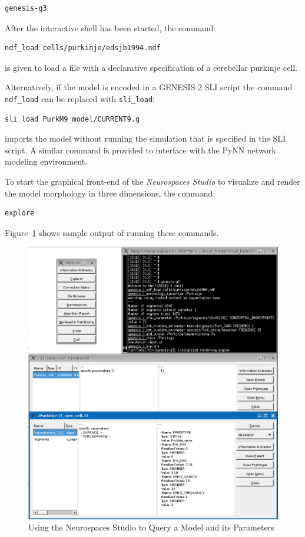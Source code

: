 \documentclass[12pt]{article}
\begin{document}
{\footnotesize
\begin{verbatim}
genesis-g3
\end{verbatim}
}

After the interactive shell has been started, the command:

{\footnotesize
\begin{verbatim}
ndf_load cells/purkinje/edsjb1994.ndf
\end{verbatim}
}

is given to load a file with a declarative specification of a
cerebellar purkinje cell.

Alternatively, if the model is encoded in a GENESIS 2 SLI script the
command {\tt ndf\_load} can be replaced with {\tt sli\_load}:

{\footnotesize
\begin{verbatim}
sli_load PurkM9_model/CURRENT9.g
\end{verbatim}
}

imports the model without running the simulation that is specified in
the SLI script.  A similar command is provided to interface with the
PyNN network modeling environment\cite{andrew08:_pynn}.

To start the graphical front-end of the {\it Neurospaces Studio} to
visualize and render the model morphology in three dimensions, the
command:

{\footnotesize
\begin{verbatim}
explore
\end{verbatim}
}

Figure~\ref{fig:cbi-studio} shows sample output of running these
commands.

\begin{figure}[ht]
  \centering
  \includegraphics[scale=0.3]{figures/studio-screenshot.eps}
  \caption{Using the Neurospaces Studio to Query a Model and its
    Parameters}
  \label{fig:cbi-studio}
\end{figure}
\end{document}
